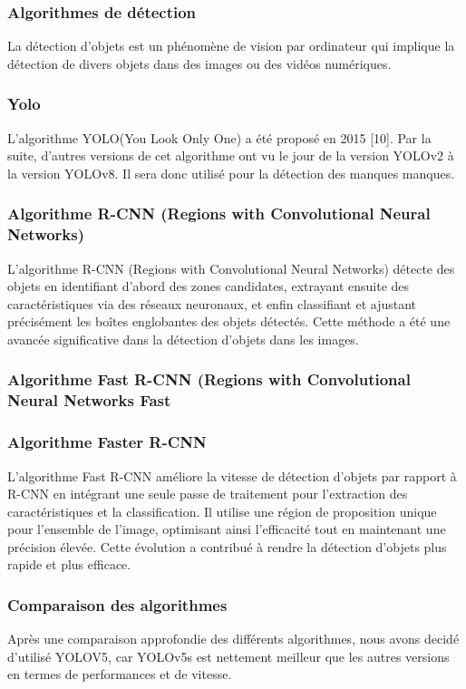 \documentclass{article}
\begin{document}
	\subsubsection{Algorithmes de détection}
	La détection d’objets est un phénomène de vision par ordinateur qui implique la détection
	de divers objets dans des images ou des vidéos numériques.
	
	
	\subsubsection{Yolo}
	L’algorithme YOLO(You Look Only One) a été proposé en 2015 [10]. Par la suite, d’autres
	versions de cet algorithme ont vu le jour de la version YOLOv2 à la version YOLOv8.
	Il sera donc utilisé pour la détection des manques manques.
	
	\subsubsection{Algorithme R-CNN (Regions with Convolutional Neural Networks)}
	L'algorithme R-CNN (Regions with Convolutional Neural Networks) détecte des objets en identifiant d'abord des zones candidates, extrayant ensuite des caractéristiques via des réseaux neuronaux, et enfin classifiant et ajustant précisément les boîtes englobantes des objets détectés. Cette méthode a été une avancée significative dans la détection d'objets dans les images.
	
	\subsubsection{Algorithme Fast R-CNN (Regions with Convolutional Neural Networks Fast}
	
	
	\subsubsection{Algorithme Faster R-CNN}
	L'algorithme Fast R-CNN améliore la vitesse de détection d'objets par rapport à R-CNN en intégrant une seule passe de traitement pour l'extraction des caractéristiques et la classification. Il utilise une région de proposition unique pour l'ensemble de l'image, optimisant ainsi l'efficacité tout en maintenant une précision élevée. Cette évolution a contribué à rendre la détection d'objets plus rapide et plus efficace.
	
	\subsubsection{Comparaison des algorithmes}
	Après une comparaison approfondie des différents algorithmes, nous avons decidé d'utilisé  YOLOV5, car
	YOLOv5s est nettement meilleur que les autres versions en termes de performances et de vitesse.
	
\end{document}
